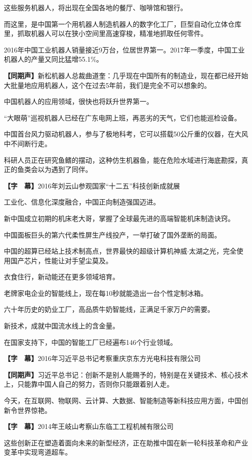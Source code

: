 \documentclass{ctexart}
\newcommand{\zkh}[1]{\textbf{\hspace{-2.7em} 【#1】}}
\begin{document}
 这些服务机器人，将出现在全国各地的餐厅、咖啡馆和银行。

而这里，是中国第一个用机器人制造机器人的数字化工厂，巨型自动化立体仓库里，抓取机器人可以在狭小空间里高速穿梭，精准地抓取任何零件。

2016年中国工业机器人销量接近9万台，位居世界第一。2017年一季度，中国工业机器人的产量又同比猛增55.1{\%}。

 \zkh{同期声}新松机器人总裁曲道奎：几乎现在中国所有的制造业，现在都已经开始大批量地应用机器人，这个在过去5年前，我们是完全不可以想象的。

 中国机器人的应用领域，很快也将跃升世界第一。

 ``大眼萌''巡视机器人已经在广东电网上班，再恶劣的天气，它们也能巡检设备。

中国首台风力驱动机器人，参与了极地科考，它可以搭载50公斤重的仪器，在大风中不间断行走。

科研人员正在研究鱼鳍的摆动，这种仿生机器鱼，能在危险水域进行海底勘探，真正的鱼类会以为遇到了同伴。

 \zkh{字　幕}2016年刘云山参观国家``十二五''科技创新成就展

 工业化、信息化深度融合，中国正向制造强国迈进。

 新中国成立初期的机床老大哥，掌握了全球最先进的高端智能机床制造诀窍。

 中国面板巨头的第六代柔性屏生产线投产，一举打破了国外垄断的局面。

 中国的超算已经站上技术制高点，世界最快的超级计算机神威$\cdot 
$太湖之光，完全使用国产芯片，性能让对手望尘莫及。

 衣食住行，新动能还在更多领域培育。

 老牌家电企业的智能线上，现在每10秒就能造出一台个性定制冰箱。

 六十年历史的奶业工厂，高品质牛奶智能线，正满足千家万户的需要。

 新技术，成就中国流水线上的含金量。

 在国家支持下，中国的智能工厂已经遍布146个行业领域。

 \zkh{字　幕}2016年习近平总书记考察重庆京东方光电科技有限公司

 \zkh{同期声}习近平总书记：创新不是别人能赐予的，特别是在关键技术、核心技术上，只能靠中国人自己的努力，否则你只能跟着别人走。

 
今天，在互联网、物联网、云计算、大数据、智能制造等新科技应用方面，中国创新令世界惊艳。

 \zkh{字　幕}2014年王岐山考察山东临工工程机械有限公司
 
这些创新正在塑造着面向未来的新型经济，正在助推中国在新一轮科技革命和产业变革中实现弯道超车。
\end{document}

